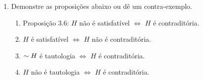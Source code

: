 \begin{enumerate}
  \item Demonstre as proposições abaixo ou dê um contra-exemplo.
    \begin{enumerate}
      \item Proposição 3.6: $H$ não é satisfatível $\Leftrightarrow$ $H$ é contraditória.
      \item $H$ é satisfatível $\Leftrightarrow$ $H$ não é contraditória.
      \item $\sim H$ é tautologia $\Leftrightarrow$ $H$ é contraditória.
      \item $H$ não é tautologia $\Leftrightarrow$ $H$ é contraditória.
    \end{enumerate}
  


\end{enumerate}

  
  
